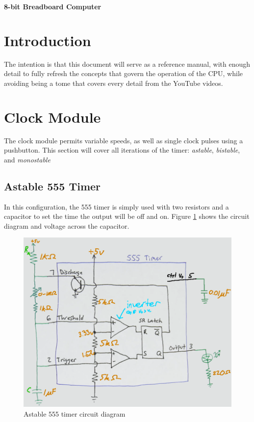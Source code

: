 \documentclass[12pt]{article}
\begin{document}
\begin{titlepage}
\begin{center}
\large
\vspace{0.8cm}
\textbf{8-bit Breadboard Computer}\\
\end{center}
\end{titlepage}



\begin{FlushLeft}

\section*{Introduction}
The intention is that this document will serve as a reference manual, with enough detail to fully refresh the concepts that govern the operation of the CPU, while avoiding being a tome that covers every detail from the YouTube videos.
\clearpage


\section{Clock Module}
The clock module permits variable speeds, as well as single clock pulses using a pushbutton. This section will cover all iterations of the timer: \textit{astable}, \textit{bistable}, and \textit{monostable}


\subsection{Astable 555 Timer} 
In this configuration, the 555 timer is simply used with two resistors and a capacitor to set the time the output will be off and on. Figure \ref{fig:astable_circuit_diagram} shows the circuit diagram and voltage across the capacitor. \\

\begin{figure}[h]
  \begin{center}
    \includegraphics[width=0.8\linewidth]{../modules/clock/astable_circuit_diagram.png}
    \caption{Astable 555 timer circuit diagram}
    \label{fig:astable_circuit_diagram}
  \end{center}
\end{figure}


\end{FlushLeft}
\end{document}
